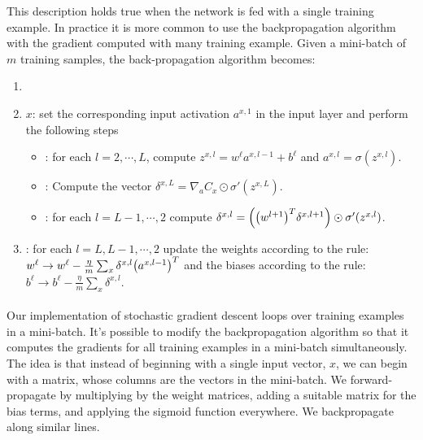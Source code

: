 This description holds true when the network is fed with a single training example. In practice it is more common to use the backpropagation algorithm with the gradient computed with many training example. Given a mini-batch of $m$ training samples, the back-propagation algorithm becomes:
\begin{enumerate}
\item {}
\item {} $x$: set the corresponding input activation $a^{x,1}$ in the input layer and perform the following steps
\begin{itemize}
\item {}: for each $l=2,\cdots, L$, compute $z^{x,l} = w^\ell a^{x, l-1} +b^\ell$ and $a^{x,l} = \sigma(z^{x,l})$.
\item {}: Compute the vector $\delta^{x,L}= \nabla_a C_x \odot \sigma'(z^{x,L})$.
\item {}: for each $l=L-1, \cdots, 2$ compute $\delta^{x,l}=\br{\br{w^{l+1}}^T\delta^{x,l+1}}\odot \sigma'(z^{x,l})$.
\end{itemize}
\item {}: for each $l=L, L-1,\cdots,2$ update the weights according to the rule: $w^\ell \rightarrow w^\ell -\frac{\eta}{m} \sum_x \delta^{x,l}\br{a^{x,l-1}}^T$ and the biases according to the rule: $b^\ell \rightarrow b^\ell -\frac{\eta}{m} \sum_x \delta^{x,l}$.
\end{enumerate}

\paragraph{} Our implementation of stochastic gradient descent loops over training examples in a mini-batch. It's possible to modify the backpropagation algorithm so that it computes the gradients for all training examples in a mini-batch simultaneously. The idea is that instead of beginning with a single input vector, $x$, we can begin with a matrix, whose columns are the vectors in the mini-batch. We forward-propagate by multiplying by the weight matrices, adding a suitable matrix for the bias terms, and applying the sigmoid function everywhere. We backpropagate along similar lines.


